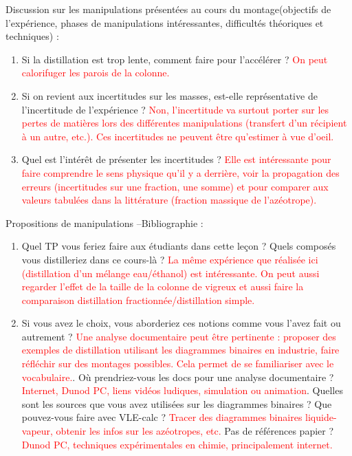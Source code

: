 \begin{reportBlock}{Discussion sur les manipulations présentées au cours du montage(objectifs de l’expérience, phases de manipulations intéressantes, difficultés théoriques et techniques) :}
\begin{enumerate}
      \item Si la distillation est trop lente, comment faire pour l'accélérer ? \textcolor{red}{On peut calorifuger les parois de la colonne.}
      \item Si on revient aux incertitudes sur les masses, est-elle représentative de l’incertitude de l’expérience ? \textcolor{red}{Non, l'incertitude va surtout porter sur les pertes de matières lors des différentes manipulations (transfert d'un récipient à un autre, etc.). Ces incertitudes ne peuvent être qu'estimer à vue d'oeil.}
      \item Quel est l’intérêt de présenter les incertitudes ? \textcolor{red}{Elle est intéressante pour faire comprendre le sens physique qu'il y a derrière, voir la propagation des erreurs (incertitudes sur une fraction, une somme) et pour comparer aux valeurs tabulées dans la littérature (fraction massique de l'azéotrope).}
      
  \end{enumerate}

\end{reportBlock}

\begin{reportBlock}{Propositions de manipulations –Bibliographie :}
\begin{enumerate}
    \item Quel TP vous feriez faire aux étudiants dans cette leçon ? Quels composés vous distilleriez dans ce cours-là ? \textcolor{red}{La même expérience que réalisée ici (distillation d'un mélange eau/éthanol) est intéressante. On peut aussi regarder l'effet de la taille de la colonne de vigreux et aussi faire la comparaison distillation fractionnée/distillation simple.}
    \item Si vous avez le choix, vous aborderiez ces notions comme vous l’avez fait ou autrement ? \textcolor{red}{Une analyse documentaire peut être pertinente : proposer des exemples de distillation utilisant les diagrammes binaires en industrie, faire réfléchir sur des montages possibles. Cela permet de se familiariser avec le vocabulaire.}. Où prendriez-vous les docs pour une analyse documentaire ? \textcolor{red}{Internet, Dunod PC, liens vidéos ludiques, simulation ou animation}. Quelles sont les sources que vous avez utilisées sur les diagrammes binaires ? Que pouvez-vous faire avec VLE-calc ? \textcolor{red}{Tracer des diagrammes binaires liquide-vapeur, obtenir les infos sur les azéotropes, etc.} Pas de références papier ? \textcolor{red}{Dunod PC, techniques expérimentales en chimie, principalement internet.}
\end{enumerate} 
\end{reportBlock}



